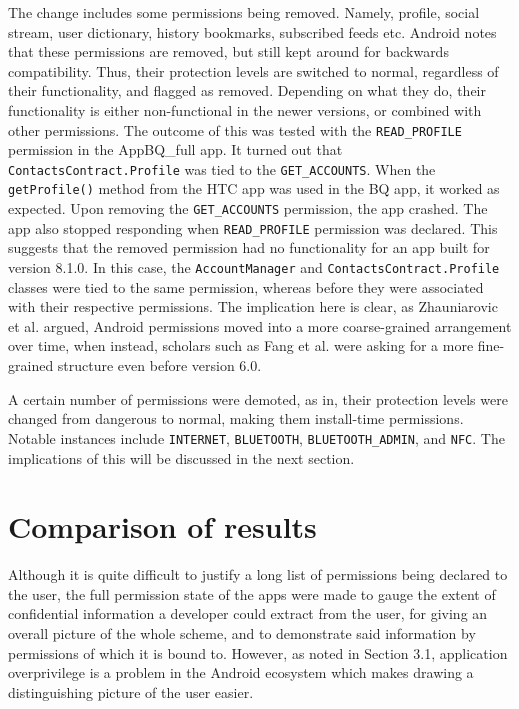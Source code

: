 \documentclass[
  a4paper,  %
  twoside,  %
  bibliography=totoc,
  headsepline,
  cleardoublepage=empty,
  parskip=half,
  draft=false,
  open=any
]{scrbook}
\begin{document}
The change includes some permissions being removed. Namely, profile, social stream, user dictionary, history bookmarks, subscribed feeds etc. Android notes that these permissions are removed, but still kept around for backwards compatibility. Thus, their protection levels are switched to normal, regardless of their functionality, and flagged as removed. Depending on what they do, their functionality is either non-functional in the newer versions, or combined with other permissions. The outcome of this was tested with the \texttt{READ\_PROFILE} permission in the AppBQ\_full app. It turned out that \texttt{ContactsContract.Profile} was tied to the \texttt{GET\_ACCOUNTS}. When the \texttt{getProfile()} method from the HTC app was used in the BQ app, it worked as expected. Upon removing the \texttt{GET\_ACCOUNTS} permission, the app crashed. The app also stopped responding when \texttt{READ\_PROFILE} permission was declared. This suggests that the removed permission had no functionality for an app built for version 8.1.0. In this case, the \texttt{AccountManager} and \texttt{ContactsContract.Profile} classes were tied to the same permission, whereas before they were associated with their respective permissions. The implication here is clear, as Zhauniarovic et al. argued, Android permissions moved into a more coarse-grained arrangement over time, when instead, scholars such as Fang et al. were asking for a more fine-grained structure even before version 6.0.

A certain number of permissions were demoted, as in, their protection levels were changed from dangerous to normal, making them install-time permissions. Notable instances include \texttt{INTERNET}, \texttt{BLUETOOTH}, \texttt{BLUETOOTH\_ADMIN}, and \texttt{NFC}. The implications of this will be discussed in the next section.

\section{Comparison of results}
Although it is quite difficult to justify a long list of permissions being declared to the user, the full permission state of the apps were made to gauge the extent of confidential information a developer could extract from the user, for giving an overall picture of the whole scheme, and to demonstrate said information by permissions of which it is bound to. However, as noted in Section 3.1, application overprivilege is a problem in the Android ecosystem which makes drawing a distinguishing picture of the user easier.
\end{document}
